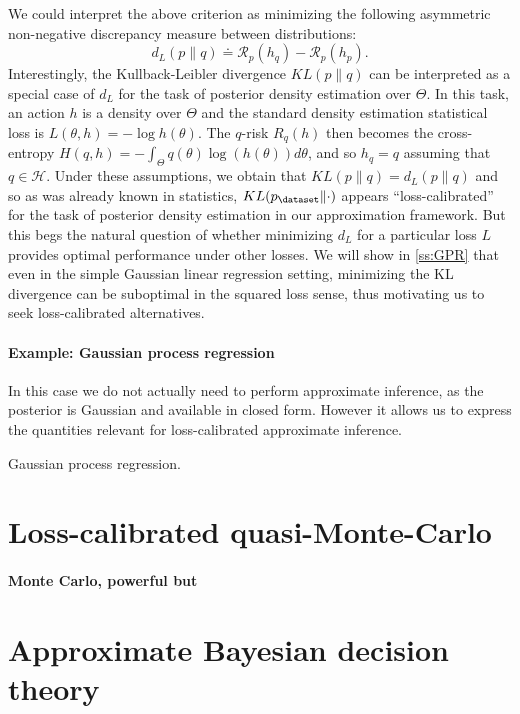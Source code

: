 We could interpret the above criterion as minimizing the following asymmetric non-negative discrepancy measure between distributions:
\begin{equation} \label{e:d_L}
    d_L(p\|q) \doteq \mathcal{R}_{p}(h_q) - \mathcal{R}_{p}(h_p).
\end{equation}
Interestingly, the Kullback-Leibler divergence $KL(p\|q)$ can be interpreted as a special case of $d_L$ for the task of posterior density estimation over $\Theta$. In this task, an action $h$ is a density over $\Theta$ and the standard density estimation statistical loss is $L(\theta,h) = -\log h(\theta)$. The $q$-risk $R_q(h)$ then becomes the cross-entropy $H(q,h)=-\int_\Theta q(\theta) \log(h(\theta)) d\theta$, and so $h_q = q$ assuming that $q \in \mathcal{H}$. Under these assumptions, we obtain that $KL(p\|q) = d_L(p\|q)$ and so as was already known in statistics, $KL(p_\dataset\|\cdot)$ appears ``loss-calibrated'' for the task of posterior density estimation in our approximation framework. But this begs the natural question of whether minimizing $d_L$ for a particular loss $L$ provides optimal performance under other losses. We will show in \ref{ss:GPR} that even in the simple Gaussian linear regression setting, minimizing the KL divergence can be suboptimal in the squared loss sense, thus motivating us to seek loss-calibrated alternatives.

\paragraph{Example: Gaussian process regression}

In this case we do not actually need to perform approximate inference, as the posterior is Gaussian and available in closed form. However it allows us to express the quantities relevant for loss-calibrated approximate inference.

Gaussian process regression.

\section{Loss-calibrated quasi-Monte-Carlo}

\paragraph{Monte Carlo, powerful but}

\section{Approximate Bayesian decision theory}


